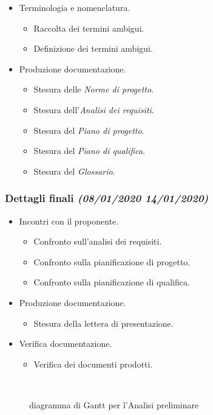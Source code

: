\documentclass[../piano-di-progetto.tex]{subfiles}
\begin{document}
\begin{itemize}
\begin{itemize}
  \end{itemize}
  \item Terminologia e nomenclatura.
  \begin{itemize}
    \item Raccolta dei termini ambigui.
    \item Definizione dei termini ambigui.
  \end{itemize}
  \item Produzione documentazione.
  \begin{itemize}
    \item Stesura delle \textit{Norme di progetto}.
    \item Stesura dell'\textit{Analisi dei requisiti}.
    \item Stesura del \textit{Piano di progetto}.
    \item Stesura del \textit{Piano di qualifica}.
    \item Stesura del \textit{Glossario}.
  \end{itemize}
\end{itemize}
\subsubsection[Dettagli finali]{Dettagli finali {\normalsize\normalfont\itshape(08/01/2020  14/01/2020)}}%
\label{subs:dettagli_finali}
\begin{itemize}
  \item Incontri con il proponente.
  \begin{itemize}
    \item Confronto sull'analisi dei requisiti.
    \item Confronto sulla pianificazione di progetto.
    \item Confronto sulla pianificazione di qualifica.
  \end{itemize}
  \item Produzione documentazione.
  \begin{itemize}
    \item Stesura della lettera di presentazione.
  \end{itemize}
  \item Verifica documentazione.
  \begin{itemize}
    \item Verifica dei documenti prodotti.
  \end{itemize}
\end{itemize}
\begin{figure}[H]
  \centering
  
  \caption{diagramma di Gantt per l'Analisi preliminare}%
~~\label{fig:gantt_analisi_preliminare}
\end{figure}
\end{document}
